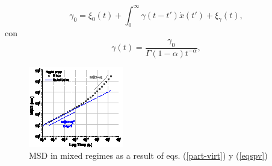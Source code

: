 \documentclass{article}
\begin{document}
\begin{equation}\label{genlan}
\gamma_0=\xi_0(t)+\int_0^\infty\gamma(t-t')\dot{x}(t')+\xi_\gamma(t),
\end{equation}
con 
\begin{equation}
\gamma(t)=\frac{\gamma_0}{\Gamma(1-\alpha)t^{-\alpha}},
\end{equation}

\begin{figure}[h!]
\centering
\includegraphics[scale=5]{img/msdmx}
\caption[MSD in mixed regimes as a result of eqs. (\ref{part-virt}) y (\ref{eqspv})]{MSD in mixed regimes as a result of eqs. (\ref{part-virt}) y (\ref{eqspv})}
\label{regmx}
\end{figure}
\end{document}
